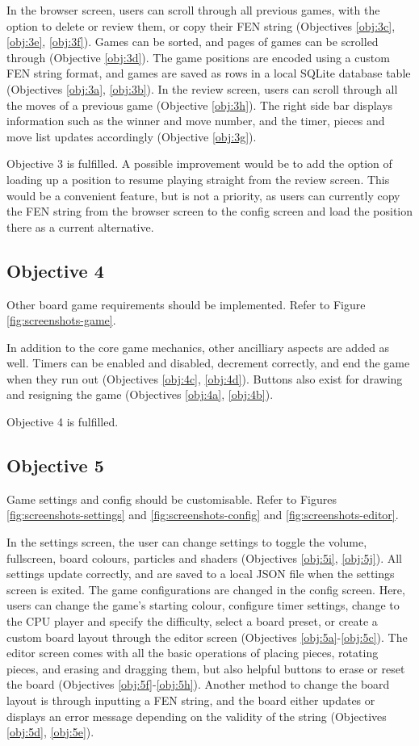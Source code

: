 \documentclass[../main/main.tex]{subfiles}
\begin{document}
In the browser screen, users can scroll through all previous games, with the option to delete or review them, or copy their FEN string (Objectives \ref{obj:3c}, \ref{obj:3e}, \ref{obj:3f}). Games can be sorted, and pages of games can be scrolled through (Objective \ref{obj:3d}). The game positions are encoded using a custom FEN string format, and games are saved as rows in a local SQLite database table (Objectives \ref{obj:3a}, \ref{obj:3b}). In the review screen, users can scroll through all the moves of a previous game (Objective \ref{obj:3h}). The right side bar displays information such as the winner and move number, and the timer, pieces and move list updates accordingly (Objective \ref{obj:3g}).

Objective 3 is fulfilled. A possible improvement would be to add the option of loading up a position to resume playing straight from the review screen. This would be a convenient feature, but is not a priority, as users can currently copy the FEN string from the browser screen to the config screen and load the position there as a current alternative.

\subsection{Objective 4}
Other board game requirements should be implemented. Refer to Figure \ref{fig:screenshots-game}.

In addition to the core game mechanics, other ancilliary aspects are added as well. Timers can be enabled and disabled, decrement correctly, and end the game when they run out (Objectives \ref{obj:4c}, \ref{obj:4d}). Buttons also exist for drawing and resigning the game (Objectives \ref{obj:4a}, \ref{obj:4b}).

Objective 4 is fulfilled.

\subsection{Objective 5}
Game settings and config should be customisable. Refer to Figures \ref{fig:screenshots-settings} and \ref{fig:screenshots-config} and \ref{fig:screenshots-editor}.

In the settings screen, the user can change settings to toggle the volume, fullscreen, board colours, particles and shaders (Objectives \ref{obj:5i}, \ref{obj:5j}). All settings update correctly, and are saved to a local JSON file when the settings screen is exited. The game configurations are changed in the config screen. Here, users can change the game's starting colour, configure timer settings, change to the CPU player and specify the difficulty, select a board preset, or create a custom board layout through the editor screen (Objectives \ref{obj:5a}-\ref{obj:5c}). The editor screen comes with all the basic operations of placing pieces, rotating pieces, and erasing and dragging them, but also helpful buttons to erase or reset the board (Objectives \ref{obj:5f}-\ref{obj:5h}). Another method to change the board layout is through inputting a FEN string, and the board either updates or displays an error message depending on the validity of the string (Objectives \ref{obj:5d}, \ref{obj:5e}).
\end{document}
